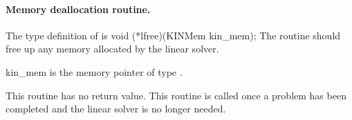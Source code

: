 
\paragraph{Memory deallocation routine.}
The type definition of  is
{
  void (*lfree)(KINMem kin\_mem);
}
{
  The routine  should free up any memory allocated by the linear
  solver.
}
{
  \begin{args}
  \item[kin\_mem]
    is the {\kinsol} memory pointer of type .
  \end{args}
}
{
  This routine has no return value.
}
{
  This routine is called once a problem has been completed and the 
  linear solver is no longer needed.
}